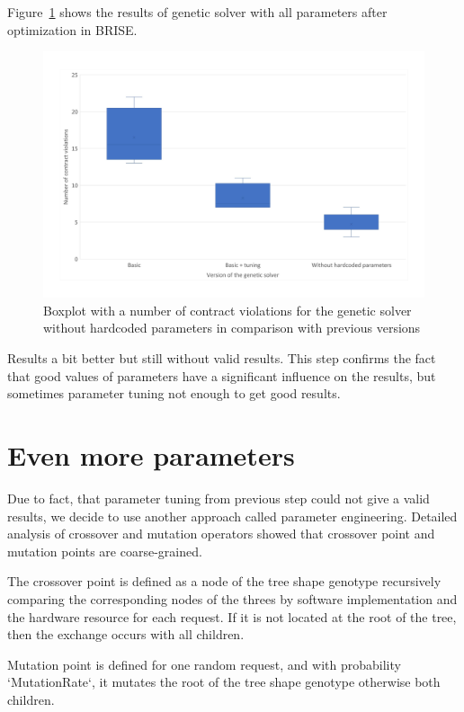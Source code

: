 Figure~\ref{fig:boxplotsolverNoHardcodedTuning} shows the results of genetic solver with all parameters after optimization in BRISE.
\begin{figure}
	\centering
	\includegraphics[width=\textwidth]{images/BoxPlotSolverNoHardcodedTuning.pdf}
	\caption[Boxplot with a number of contract violations for the genetic solver without hardcoded parameters in comparison with previous versions]{Boxplot with a number of contract violations for the genetic solver without hardcoded parameters in comparison with previous versions}
	\label{fig:boxplotsolverNoHardcodedTuning}
\end{figure}
Results a bit better but still without valid results.
This step confirms the fact that good values of parameters have a significant influence on the results, but sometimes parameter tuning not enough to get good results. 

\section{Even more parameters}
Due to fact, that parameter tuning from previous step could not give a valid results, we decide to use another approach called parameter engineering.
Detailed analysis of crossover and mutation operators showed that crossover point and mutation points are coarse-grained.

The crossover point is defined as a node of the tree shape genotype recursively comparing the corresponding nodes of the threes by software implementation and the hardware resource for each request.
If it is not located at the root of the tree, then the exchange occurs with all children.

Mutation point is defined for one random request, and with probability `MutationRate`, it mutates the root of the tree shape genotype otherwise both children.

